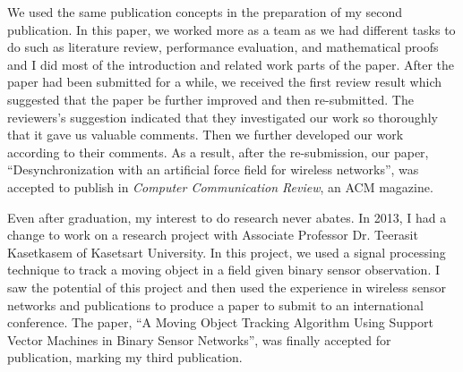 \documentclass[a4paper,12pt]{report}
\begin{document}
\vspace{0.2cm}
We used the same publication concepts in the preparation of my second publication. In this paper, we worked more as a team as we had different tasks to do such as literature review, performance evaluation, and mathematical proofs and I did most of the introduction and related work parts of the paper. After the paper had been submitted for a while, we received the first review result which suggested that the paper be further improved and then re-submitted. The reviewers's suggestion indicated that they investigated our work so thoroughly that it gave us valuable comments. Then we further developed our work according to their comments. As a result, after the re-submission, our paper, ``Desynchronization with an artificial force field for wireless networks'', was accepted to publish in \textit{Computer Communication Review}, an ACM magazine.

\vspace{0.2cm}
Even after graduation, my interest to do research never abates. In 2013, I had a change to work on a research project with Associate Professor Dr. Teerasit Kasetkasem of Kasetsart University. In this project, we used a signal processing technique to track a moving object in a field given binary sensor observation. I saw the potential of this project and then used the experience in wireless sensor networks and publications to produce a paper to submit to an international conference. The paper, ``A Moving Object Tracking Algorithm Using Support Vector Machines in Binary Sensor Networks'', was finally accepted for publication, marking my third publication. 
\end{document}
